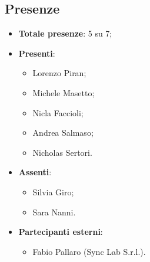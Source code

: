 \documentclass[11pt]{article}
\begin{document}
		\subsection{Presenze}
			\begin{itemize}
				\item \textbf{Totale presenze}: 5 su 7;
				\item \textbf{Presenti}:
				\begin{itemize}
					\item Lorenzo Piran; 
					\item Michele Masetto;
					\item Nicla Faccioli;
					\item Andrea Salmaso;
					\item Nicholas Sertori.
				\end{itemize}
				\item \textbf{Assenti}: 
					\begin{itemize}
						\item Silvia Giro;
						\item Sara Nanni.
					\end{itemize}
				\item \textbf{Partecipanti esterni}:
				\begin{itemize}
					\item Fabio Pallaro (Sync Lab S.r.l.).
				\end{itemize}
			\end{itemize}
		
		\newpage
		
\end{document}
